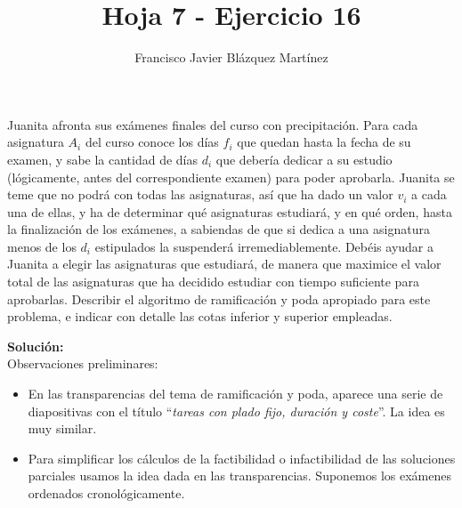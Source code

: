 \documentclass[12pt]{article}
\newenvironment{problem}[2][Problema]{\begin{trivlist}
\item[\hskip \labelsep {\bfseries #1}\hskip \labelsep {\bfseries #2.}]}{\end{trivlist}}
\begin{document}
\title{\textbf{Hoja 7 - Ejercicio 16}}
\author{Francisco Javier Blázquez Martínez}
\date{}
\maketitle
 
\begin{problem}{7.16}
Juanita afronta sus exámenes finales del curso con precipitación. Para cada asignatura
$A_i$ del curso conoce los días $f_i$ que quedan hasta la fecha de su examen, y sabe la 
cantidad de días $d_i$ que debería dedicar a su estudio (lógicamente, antes del 
correspondiente examen) para poder aprobarla. Juanita se teme que no podrá con todas las 
asignaturas, así que ha dado un valor $v_i$ a cada una de ellas, y ha de determinar qué 
asignaturas estudiará, y en qué orden, hasta la finalización de los exámenes, a sabiendas 
de que si dedica a una asignatura menos de los $d_i$ estipulados la suspenderá 
irremediablemente. Debéis ayudar a Juanita a elegir las asignaturas que estudiará, de 
manera que maximice el valor total de las asignaturas que ha decidido estudiar con tiempo 
suficiente para aprobarlas. Describir el algoritmo de ramificación y poda apropiado para
este problema, e indicar con detalle las cotas inferior y superior empleadas.
\end{problem}

\textbf{Solución:} \\


\setlength{\parskip}{0mm}
Observaciones preliminares:

\begin{itemize}
    \item En las transparencias del tema de ramificación y poda, aparece una serie de 
          diapositivas con el título ``\textit{tareas con plado fijo, duración y coste}''.
          La idea es muy similar.
    \item Para simplificar los cálculos de la factibilidad o infactibilidad de las soluciones
          parciales usamos la idea dada en las transparencias. Suponemos los exámenes 
          ordenados cronológicamente.
\end{itemize}
\setlength{\parskip}{\baselineskip}
\end{document}
